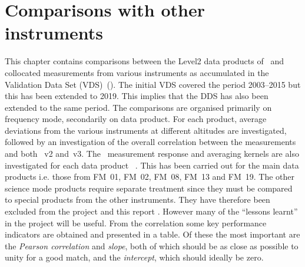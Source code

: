 \chapter{Comparisons with other instruments}
\label{chapter:comparisons}
This chapter contains comparisons between the Level2 data products of \smr\
and collocated measurements from various instruments as accumulated in the
Validation Data Set (VDS)~(\cite{VDS:2016}). The initial VDS covered the
period 2003--2015 but this has been extended to 2019. This implies that the
DDS has also been extended to the same period. The comparisons are organised
primarily on frequency mode, secondarily on data product. For each product,
average deviations from the various instruments at different altitudes are
investigated, followed by an investigation of the overall correlation between
the measurements and both \smr~v2 and~v3. The \smr\ measurement response and
averaging kernels are also investigated for each data product~\cite{atbdl2} .
This has been carried out for the main data products i.e. those from FM~01,
FM~02, FM~08, FM~13 and FM~19. The other science mode products require
separate treatment since they must be compared to special products from the
other instruments. They have therefore been excluded from the project and
this report . However many of the ``lessons learnt'' in the project will be
useful. From the correlation some key performance indicators are obtained and
presented in a table. Of these the most important are the \emph{Pearson
correlation} and \emph{slope}, both of which should be as close as possible
to unity for a good match, and the \emph{intercept}, which should ideally be
zero.

